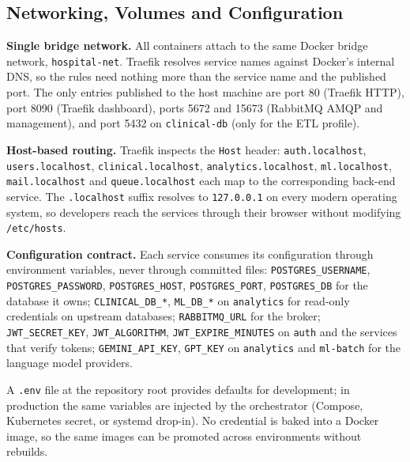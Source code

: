 \subsection{Networking, Volumes and Configuration}

\textbf{Single bridge network.} All containers attach to the same Docker bridge network, \texttt{hospital-net}. Traefik resolves service names against Docker's internal DNS, so the rules need nothing more than the service name and the published port. The only entries published to the host machine are port 80 (Traefik HTTP), port 8090 (Traefik dashboard), ports 5672 and 15673 (RabbitMQ AMQP and management), and port 5432 on \texttt{clinical-db} (only for the ETL profile).

\textbf{Host-based routing.} Traefik inspects the \texttt{Host} header: \texttt{auth.localhost}, \texttt{users.localhost}, \texttt{clinical.localhost}, \texttt{analytics.localhost}, \texttt{ml.localhost}, \texttt{mail.localhost} and \texttt{queue.localhost} each map to the corresponding back-end service. The \texttt{.localhost} suffix resolves to \texttt{127.0.0.1} on every modern operating system, so developers reach the services through their browser without modifying \texttt{/etc/hosts}.

\textbf{Configuration contract.} Each service consumes its configuration through environment variables, never through committed files: \texttt{POSTGRES\_USERNAME}, \texttt{POSTGRES\_PASSWORD}, \texttt{POSTGRES\_HOST}, \texttt{POSTGRES\_PORT}, \texttt{POSTGRES\_DB} for the database it owns; \texttt{CLINICAL\_DB\_*}, \texttt{ML\_DB\_*} on \texttt{analytics} for read-only credentials on upstream databases; \texttt{RABBITMQ\_URL} for the broker; \texttt{JWT\_SECRET\_KEY}, \texttt{JWT\_ALGORITHM}, \texttt{JWT\_EXPIRE\_MINUTES} on \texttt{auth} and the services that verify tokens; \texttt{GEMINI\_API\_KEY}, \texttt{GPT\_KEY} on \texttt{analytics} and \texttt{ml-batch} for the language model providers.

A \texttt{.env} file at the repository root provides defaults for development; in production the same variables are injected by the orchestrator (Compose, Kubernetes secret, or systemd drop-in). No credential is baked into a Docker image, so the same images can be promoted across environments without rebuilds.
